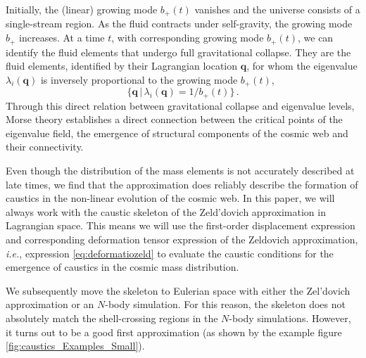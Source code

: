 \documentclass[a4paper, 11pt]{article}
\begin{document}
\bigskip
\noindent Initially, the (linear) growing mode $b_+(t)$ vanishes and the universe consists of a single-stream region. As the fluid contracts under self-gravity, the growing mode $b_+$ increases. At a time $t$, with corresponding growing mode $b_+(t)$, we can identify the fluid elements that undergo full gravitational collapse. They are the fluid elements, identified by their Lagrangian location $\bm{q}$, for whom the
eigenvalue $\lambda_i(\bm{q})$ is inversely proportional to the growing mode $b_+(t)$, 
\begin{equation}
  \{\bm{q}\,|\,\lambda_i(\bm{q})=1/b_+(t)\}\,.
  \end{equation}
Through this direct relation between gravitational collapse and eigenvalue levels, Morse theory establishes a direct connection between the critical points of the eigenvalue field, the emergence of structural components of the cosmic web and their connectivity. 

Even though the distribution of the mass elements is not accurately described at late times, we find that the approximation does reliably describe the formation of caustics in the non-linear evolution of the cosmic web. In this paper, we will always work with the caustic skeleton of the Zeld'dovich approximation in Lagrangian space. This means we will use the first-order displacement expression and corresponding deformation tensor expression of the Zeldovich approximation, \textit{i.e.}, expression \eqref{eq:deformatiozeld} to evaluate the caustic conditions for the emergence of caustics in the cosmic mass distribution.

We subsequently move the skeleton to Eulerian space with either the Zel'dovich approximation or an $N$-body simulation. For this reason, the skeleton does not absolutely match the shell-crossing regions in the $N$-body simulations. However, it turns out to be a good first approximation (as shown by the example figure \ref{fig:caustics_Examples_Small}).

\end{document}
